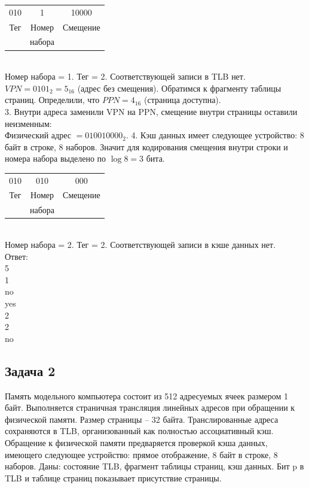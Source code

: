 \documentclass[12pt, letterpaper]{article}
\begin{document}
\begin{tabular}{c c c}
    010 & 1 & 10000  \\
    Тег& Номер & Смещение\\
    & набора &\\
\end{tabular}\\

Номер набора = 1. Тег = 2. Соответствующей записи в TLB нет. $VPN=0101_2=5_{16}$ (адрес без смещения). Обратимся к фрагменту таблицы страниц. Определили, что $PPN=4_{16}$ (страница доступна).\\
3. Внутри адреса заменили VPN на PPN, смещение внутри страницы оставили неизменным:\\
Физический адрес $=010010000_2$. 
4. Кэш данных имеет следующее устройство: 8 байт в строке, 8 наборов. Значит для кодирования смещения внутри строки и номера набора выделено по $\log 8=3$ бита.\\

\begin{tabular}{c c c}
    010 & 010 & 000  \\
    Тег& Номер & Смещение\\
    & набора &\\
\end{tabular}\\

Номер набора = 2. Тег = 2. Соответствующей записи в кэше данных нет.\\

Ответ:\\
5\\
1\\
no\\
yes\\
2\\
2\\
no
\newpage
\subsection{Задача 2}

Память модельного компьютера состоит из 512 адресуемых ячеек размером 1 байт. Выполняется страничная трансляция линейных адресов при обращении к физической памяти. Размер страницы – 32 байта. Транслированные адреса сохраняются в TLB, организованный как полностью ассоциативный кэш. Обращение к физической памяти предваряется проверкой кэша данных, имеющего следующее устройство: прямое отображение, 8 байт в строке, 8 наборов. Даны: состояние TLB, фрагмент таблицы страниц, кэш данных. Бит p в TLB и таблице страниц показывает присутствие страницы.\\
\end{document}
